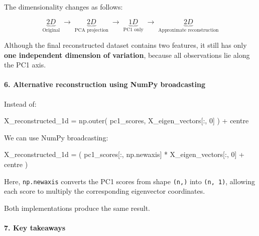\documentclass[11pt]{article}
\newenvironment{Shaded}{}{}
\newcommand{\DecValTok}[1]{\textcolor[rgb]{0.25,0.63,0.44}{{#1}}}
\newcommand{\NormalTok}[1]{{#1}}
\newcommand{\OperatorTok}[1]{\textcolor[rgb]{0.40,0.40,0.40}{{#1}}}
\begin{document}
The dimensionality changes as follows:

\[
\underbrace{2D}_{\text{Original}}
\;\longrightarrow\;
\underbrace{2D}_{\text{PCA projection}}
\;\longrightarrow\;
\underbrace{1D}_{\text{PC1 only}}
\;\longrightarrow\;
\underbrace{2D}_{\text{Approximate reconstruction}}
\]

Although the final reconstructed dataset contains two features, it still
has only \textbf{one independent dimension of variation}, because all
observations lie along the PC1 axis.

\paragraph{6. Alternative reconstruction using NumPy
broadcasting}\label{alternative-reconstruction-using-numpy-broadcasting}

Instead of:

\begin{Shaded}
\begin{Highlighting}[]
\NormalTok{X\_reconstructed\_1d }\OperatorTok{=}\NormalTok{ np.outer(}
\NormalTok{    pc1\_scores,}
\NormalTok{    X\_eigen\_vectors[:, }\DecValTok{0}\NormalTok{]}
\NormalTok{) }\OperatorTok{+}\NormalTok{ centre}
\end{Highlighting}
\end{Shaded}

We can use NumPy broadcasting:

\begin{Shaded}
\begin{Highlighting}[]
\NormalTok{X\_reconstructed\_1d }\OperatorTok{=}\NormalTok{ (}
\NormalTok{    pc1\_scores[:, np.newaxis] }\OperatorTok{*}\NormalTok{ X\_eigen\_vectors[:, }\DecValTok{0}\NormalTok{]}
    \OperatorTok{+}\NormalTok{ centre}
\NormalTok{)}
\end{Highlighting}
\end{Shaded}

Here, \texttt{np.newaxis} converts the PC1 scores from shape
\texttt{(n,)} into \texttt{(n,\ 1)}, allowing each score to multiply the
corresponding eigenvector coordinates.

Both implementations produce the same result.

\paragraph{7. Key takeaways}\label{key-takeaways}
\end{document}
